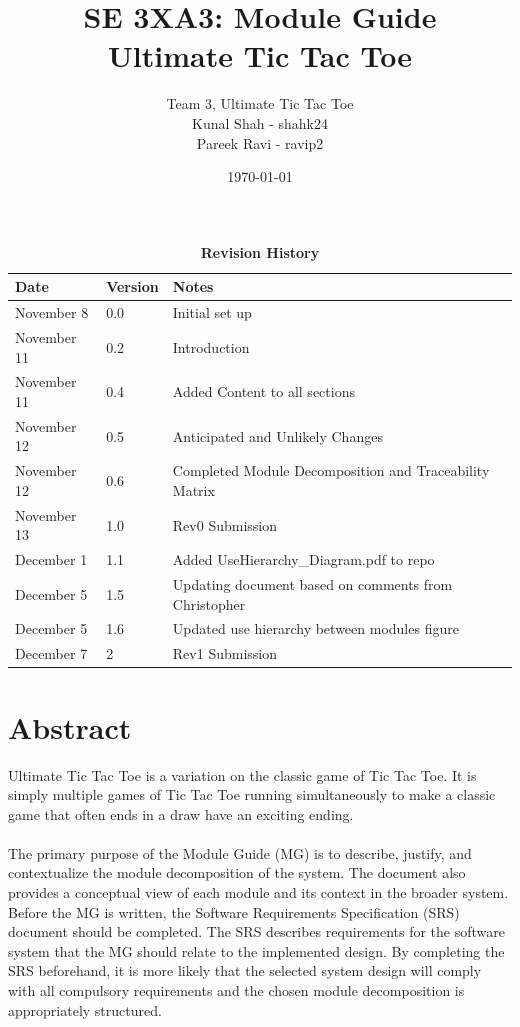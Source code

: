 \documentclass[12pt, titlepage]{article}
\title{SE 3XA3: Module Guide\\Ultimate Tic Tac Toe}
\author{Team 3, Ultimate Tic Tac Toe
		\\ Kunal Shah - shahk24
		\\ Pareek Ravi - ravip2
}
\date{\today}
\begin{document}
\maketitle
\tableofcontents
\listoftables
\listoffigures


\newpage
\begin{table}[hp]
\caption{\bf Revision History}
\begin{tabularx}{\textwidth}{llX}
\toprule {\bf Date} & {\bf Version} & {\bf Notes}\\
\midrule
November 8  & 0.0 & Initial set up\\
November 11 & 0.2 & Introduction \\
November 11 & 0.4 & Added Content to all sections \\
November 12 & 0.5 & Anticipated and Unlikely Changes\\ 
November 12 & 0.6 & Completed Module Decomposition and Traceability Matrix\\ 
November 13 & 1.0 & Rev0 Submission\\
December 1 & 1.1 & Added UseHierarchy\_Diagram.pdf to repo\\
December 5 & 1.5 & Updating document based on comments from Christopher \\
December 5 & 1.6 & Updated use hierarchy between modules figure\\
December 7 & 2 & Rev1 Submission \\
\bottomrule
\end{tabularx}
\end{table}
\newpage

\section*{Abstract}
Ultimate Tic Tac Toe is a variation on the classic game of Tic Tac Toe. It is 
simply multiple games of Tic Tac Toe running simultaneously to make a classic 
game that often ends in a draw have an exciting ending.\\\\
The primary purpose of the Module Guide (MG) is to describe, justify, and
contextualize the module decomposition of the system. The document also provides
a conceptual view of each module and its context in the broader system. Before
the MG is written, the Software Requirements Specification (SRS) document should
be completed. The SRS describes requirements for the software system that the MG
should relate to the implemented design. By completing the SRS beforehand, it
is more likely that the selected system design will comply with all compulsory
requirements and the chosen module decomposition is appropriately structured.
\end{document}
